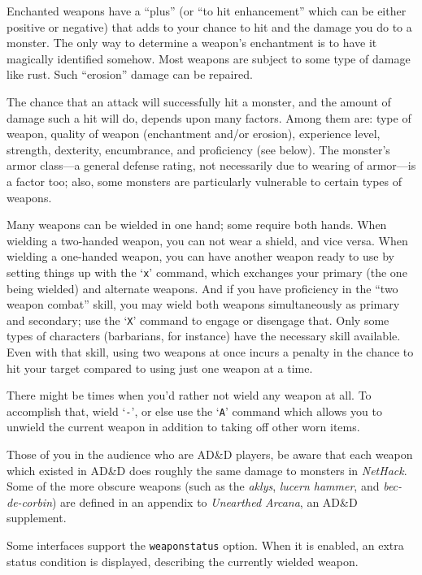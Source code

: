 \documentclass[titlepage]{article}
\begin{document}
Enchanted weapons have a ``plus'' (or ``to hit enhancement'' which can be
either positive or negative) that adds to your chance to
hit and the damage you do to a monster.  The only way to determine a weapon's
enchantment is to have it magically identified somehow.
Most weapons are subject to some type of damage like rust.  Such
``erosion'' damage can be repaired.

The chance that an attack will successfully hit a monster, and the amount
of damage such a hit will do, depends upon many factors.  Among them are:
type of weapon, quality of weapon (enchantment and/or erosion), experience
level, strength, dexterity, encumbrance, and proficiency (see below).  The
monster's armor
class---a general defense rating, not necessarily due to wearing of armor---is
a factor too; also, some monsters are particularly
vulnerable to certain types of weapons.

Many weapons can be wielded in one hand; some require both hands.
When wielding a two-handed weapon, you can not wear a shield, and
vice versa.  When wielding a one-handed weapon, you can have another
weapon ready to use by setting things up with the `\texttt{x}' command, which
exchanges your primary (the one being wielded) and alternate weapons.
And if you have proficiency in the ``two weapon combat'' skill, you
may wield both weapons simultaneously as primary and secondary; use the
`\texttt{X}' command to engage or disengage that.
Only some types of characters (barbarians, for instance) have the necessary
skill available.  Even with that skill, using two weapons at once incurs
a penalty in the chance to hit your target compared to using just one
weapon at a time.

There might be times when you'd rather not wield any weapon at all.
To accomplish that, wield `\texttt{-}', or else use the `\texttt{A}' command which
allows you to unwield the current weapon in addition to taking off
other worn items.

Those of you in the audience who are AD\&D players, be aware that each
weapon which existed in AD\&D does roughly the same damage to monsters in
\textit{NetHack}.  Some of the more obscure weapons (such as the
\textit{aklys}, \textit{lucern hammer}, and \textit{bec-de-corbin}) are defined
in an appendix to \textit{Unearthed Arcana}, an AD\&D supplement.

Some interfaces support the \texttt{weaponstatus} option.
When it is enabled, an extra status condition is displayed, describing
the currently wielded weapon.
\end{document}
